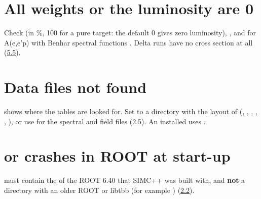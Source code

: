 \section*{\texorpdfstring{All weights or the luminosity are 0}{All weights or the luminosity are 0}}\label{user_manual-10u5ffaq:all-weights-or-the-luminosity-are-0}
Check \hyperref[param:targu25abundancy]{} (in \%, 100 for a pure target: the default 0 gives zero luminosity),\allowbreak{} \hyperref[param:EXPERu25charge]{}, and for
A(e,e'p) with Benhar spectral functions \hyperref[param:transparency]{}. Delta runs have no cross section at all
(\hyperref[user_manual-05u5freactions:55-eepu3c0-in-the-delta-region-doingu5fdelta]{5.5}).

\section*{\texorpdfstring{Data files not found}{Data files not found}}\label{user_manual-10u5ffaq:data-files-not-found}
 shows where the tables are looked for. Set  to a directory with the layout of
 (, , , , , ), or use  for the spectral and field
files (\hyperref[user_manual-02u5finstallation:25-where-the-data-files-are-found]{2.5}). An installed  uses .

\section*{\texorpdfstring{ or crashes in ROOT at start-up}{error while loading shared libraries or crashes in ROOT at start-up}}\label{user_manual-10u5ffaq:error-while-loading-shared-libraries-or-crashes-in-root-at-start-up}
 must contain the  of the ROOT 6.40 that SIMC++ was built with, and \textbf{not} a directory with an older
ROOT or libtbb (for example ) (\hyperref[user_manual-02u5finstallation:22-requirements]{2.2}).

